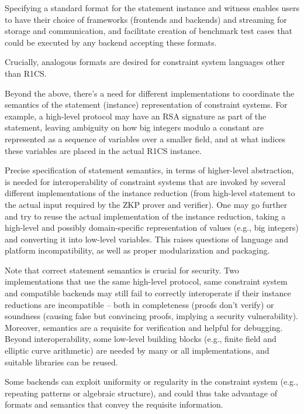 \documentclass[a4paper,12pt]{article}
\begin{document}
Specifying a standard format for the statement instance and witness enables users to have their choice of frameworks (frontends and backends) and streaming for storage and communication, and facilitate creation of benchmark test cases that could be executed by any backend accepting these formats.
 
Crucially, analogous formats are desired for constraint system languages other than R1CS.


Beyond the above, there’s a need for different implementations to coordinate the semantics of the statement (instance) representation of constraint systems. For example, a high-level protocol may have an RSA signature as part of the statement, leaving ambiguity on how big integers modulo a constant are represented as a sequence of variables over a smaller field, and at what indices these variables are placed in the actual R1CS instance.

Precise specification of statement semantics, in terms of higher-level abstraction, is needed for interoperability of constraint systems that are invoked by several different implementations of the instance reduction (from high-level statement to the actual input required by the ZKP prover and verifier). One may go further and try to reuse the actual implementation of the instance reduction, taking a high-level and possibly domain-specific representation of values (e.g., big  integers) and converting it into low-level variables. This raises questions of language and platform incompatibility, as well as proper modularization and packaging.

Note that correct statement semantics is crucial for security. Two implementations that use the same high-level protocol, same constraint system and compatible backends may still fail to correctly interoperate if their instance reductions are incompatible -- both in completeness (proofs don’t verify) or soundness (causing false but convincing proofs, implying a security vulnerability). Moreover, semantics are a requisite for verification and helpful for debugging. Beyond interoperability, some low-level building blocks (e.g., finite field and elliptic curve arithmetic) are needed by many or all implementations, and suitable libraries can be reused.

Some backends can exploit uniformity or regularity in the constraint system (e.g., repeating patterns or algebraic structure), and could thus take advantage of formats and semantics that convey the requisite information.
\end{document}
